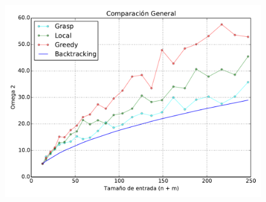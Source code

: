 \begin{figure}[H]
\begin{center}
\includegraphics[angle=0, scale=.75]{imagenes/todas-calidad.pdf}
\label{grafico local}
\end{center}
\end{figure}

